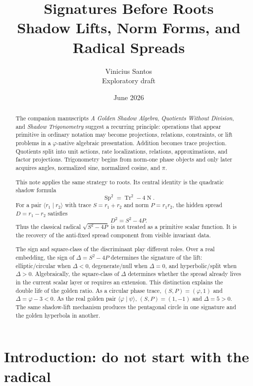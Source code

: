 \documentclass[11pt]{article}
\title{Signatures Before Roots\\
\large Shadow Lifts, Norm Forms, and Radical Spreads}
\author{Vinicius Santos\\
\small Exploratory draft}
\date{June 2026}
\newcommand{\Tr}{\operatorname{Tr}}
\newcommand{\Nm}{\operatorname{N}}
\newcommand{\Sp}{\operatorname{Sp}}
\newcommand{\ph}{\varphi}
\newcommand{\ps}{\psi}
\begin{document}
\maketitle

\begin{abstract}
The companion manuscripts \emph{A Golden Shadow Algebra}, \emph{Quotients Without Division}, and \emph{Shadow Trigonometry} suggest a recurring principle: operations that appear primitive in ordinary notation may become projections, relations, constraints, or lift problems in a $\ph$-native algebraic presentation.  Addition becomes trace projection.  Quotients split into unit actions, rate localizations, relations, approximations, and factor projections.  Trigonometry begins from norm-one phase objects and only later acquires angles, normalized sine, normalized cosine, and $\pi$.

This note applies the same strategy to roots.  Its central identity is the quadratic shadow formula
\[
    \Sp^2=\Tr^2-4\Nm.
\]
For a pair $\langle r_1\mid r_2\rangle$ with trace $S=r_1+r_2$ and norm $P=r_1r_2$, the hidden spread $D=r_1-r_2$ satisfies
\[
    D^2=S^2-4P.
\]
Thus the classical radical $\sqrt{S^2-4P}$ is not treated as a primitive scalar function.  It is the recovery of the anti-fixed spread component from visible invariant data.

The sign and square-class of the discriminant play different roles.  Over a real embedding, the sign of $\Delta=S^2-4P$ determines the signature of the lift: elliptic/circular when $\Delta<0$, degenerate/null when $\Delta=0$, and hyperbolic/split when $\Delta>0$.  Algebraically, the square-class of $\Delta$ determines whether the spread already lives in the current scalar layer or requires an extension.  This distinction explains the double life of the golden ratio.  As a circular phase trace, $(S,P)=(\ph,1)$ and $\Delta=\ph-3<0$.  As the real golden pair $\langle\ph\mid\ps\rangle$, $(S,P)=(1,-1)$ and $\Delta=5>0$.  The same shadow-lift mechanism produces the pentagonal circle in one signature and the golden hyperbola in another.
\end{abstract}

\tableofcontents

\section{Introduction: do not start with the radical}
\end{document}
